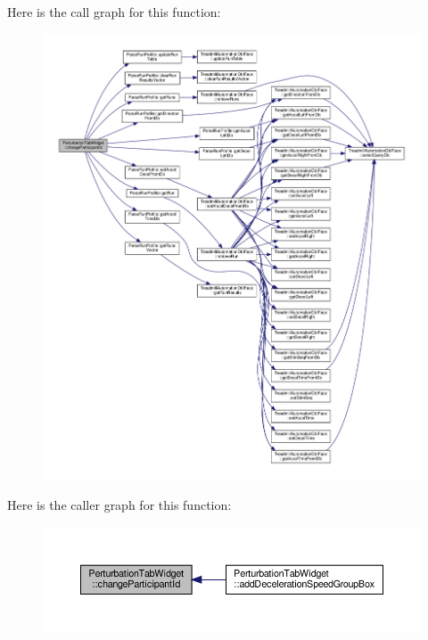 Here is the call graph for this function\+:
\nopagebreak
\begin{figure}[H]
\begin{center}
\leavevmode
\includegraphics[width=350pt]{class_perturbation_tab_widget_a67b4c15cd26d35da1eb09559e2136502_cgraph}
\end{center}
\end{figure}
Here is the caller graph for this function\+:
\nopagebreak
\begin{figure}[H]
\begin{center}
\leavevmode
\includegraphics[width=350pt]{class_perturbation_tab_widget_a67b4c15cd26d35da1eb09559e2136502_icgraph}
\end{center}
\end{figure}
\mbox{\label{class_perturbation_tab_widget_a9d551ffcaf3d0ebe54015f5536d261ab}} 
